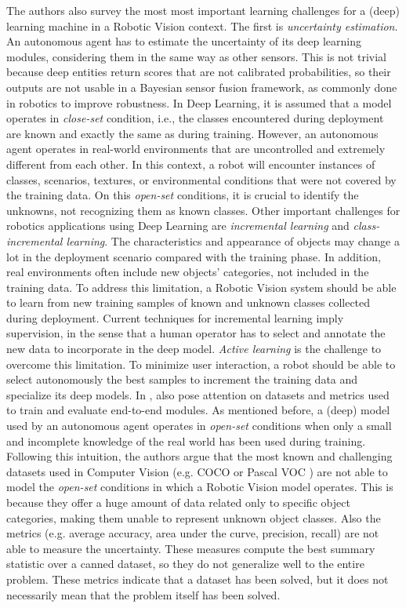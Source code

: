  The authors also survey the most most important learning challenges for a (deep) learning machine in a Robotic Vision context. The first is \textit{uncertainty estimation}. An autonomous agent has to estimate the uncertainty of its deep learning modules, considering them in the same way as other sensors. This is not trivial because deep entities return scores that are not calibrated probabilities, so their outputs are not usable in a Bayesian sensor fusion framework, as commonly done in robotics to improve robustness. In Deep Learning, it is assumed that a model operates in \textit{close-set} condition,  i.e., the classes encountered during deployment are known and exactly the same as during training. However, an autonomous agent operates in real-world environments that are uncontrolled and extremely different from each other. In this context, a robot will encounter instances of classes, scenarios, textures, or environmental conditions that were not covered by the training data. On this \textit{open-set} conditions, it is crucial to identify the unknowns, not recognizing them as known classes. Other important challenges for robotics applications using Deep Learning are \textit{incremental learning} and \textit{class-incremental learning}. The characteristics and appearance of objects may change a lot in the deployment scenario compared with the training phase. In addition, real environments often include new objects' categories, not included in the training data. To address this limitation, a Robotic Vision system should be able to learn from new training samples of known and unknown classes collected during deployment. Current techniques for incremental learning imply supervision, in the sense that a human operator has to select and annotate the new data to incorporate in the deep model. \textit{Active learning} is the challenge to overcome this limitation. To minimize user interaction, a robot should be able to select autonomously the best samples to increment the training data and specialize its deep models. In \cite{surveydeeplimits}, \citeauthor{surveydeeplimits} also pose attention on datasets and metrics used to train and evaluate end-to-end modules. As mentioned before, a (deep) model used by an autonomous agent operates in \textit{open-set} conditions when only a small and incomplete knowledge of the real world has been used during training. Following this intuition, the authors argue that the most known and challenging datasets used in Computer Vision (e.g. COCO \cite{coco} or Pascal VOC \cite{pascal}) are not able to model the \textit{open-set} conditions in which a Robotic Vision model operates. This is because they offer a huge amount of data related only to specific object categories, making them unable to represent unknown object classes. Also the metrics (e.g. average accuracy, area under the curve, precision, recall) are not able to measure the uncertainty. These measures compute the best summary statistic over a canned dataset, so they do not generalize well to the entire problem. These metrics indicate that a dataset has been solved, but it does not necessarily mean that the problem itself has been solved.  
 
